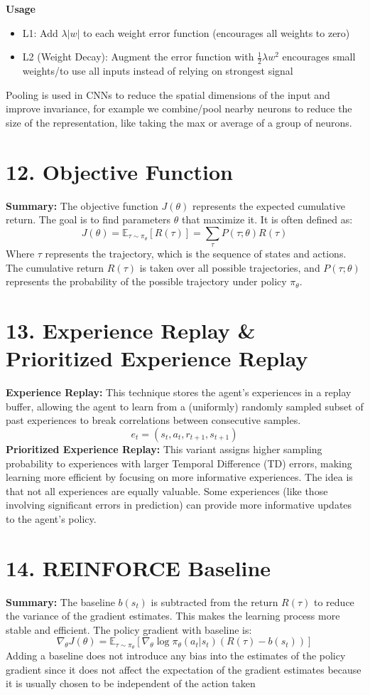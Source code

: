 \documentclass[a4paper,10pt]{article}
\begin{document}
\begin{multicols}{2}
\noindent \textbf{Usage}
\begin{itemize}
    \item L1: Add \( \lambda |w| \) to each weight error function (encourages all weights to zero)
    \item L2 (Weight Decay): Augment the error function with \( \frac{1}{2} \lambda w^2 \) encourages small weights/to use all inputs instead of relying on strongest signal
\end{itemize}
Pooling is used in CNNs to reduce the spatial dimensions of the input and improve invariance, for example we combine/pool nearby neurons to reduce the size of the representation, like taking the max or average of a group of neurons.

\section*{12. Objective Function}
\textbf{Summary:} The objective function \( J(\theta) \) represents the expected cumulative return. The goal is to find parameters \( \theta \) that maximize it. It is often defined as:
\[
J(\theta) = \mathbb{E}_{\tau \sim \pi_\theta} [R(\tau)] = \sum_{\tau} P(\tau;\theta)R(\tau)
\]
Where \( \tau \) represents the trajectory, which is the sequence of states and actions. The cumulative return \( R(\tau) \) is taken over all possible trajectories, and \( P(\tau;\theta) \) represents the probability of the possible trajectory under policy \( \pi_\theta \).

\section*{13. Experience Replay \& Prioritized Experience Replay}
\textbf{Experience Replay:} This technique stores the agent's experiences in a replay buffer, allowing the agent to learn from a (uniformly) randomly sampled subset of past experiences to break correlations between consecutive samples.
\[
e_t = (s_t, a_t, r_{t+1}, s_{t+1})
\]
\textbf{Prioritized Experience Replay:} This variant assigns higher sampling probability to experiences with larger Temporal Difference (TD) errors, making learning more efficient by focusing on more informative experiences. The idea is that not all experiences are equally valuable. Some experiences (like those involving significant errors in prediction) can provide more informative updates to the agent's policy.

\section*{14. REINFORCE Baseline}
\textbf{Summary:} The baseline \( b(s_t) \) is subtracted from the return \( R(\tau) \) to reduce the variance of the gradient estimates. This makes the learning process more stable and efficient. The policy gradient with baseline is:
\[
\nabla_\theta J(\theta) = \mathbb{E}_{\tau \sim \pi_\theta} \left[ \nabla_\theta \log \pi_\theta(a_t | s_t) (R(\tau) - b(s_t)) \right]
\]
Adding a baseline does not introduce any bias into the estimates of the policy gradient since it does not affect the expectation of the gradient estimates because it is usually chosen to be independent of the action taken


\end{multicols}
\end{document}

